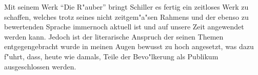 Mit seinem Werk "`Die R"auber"' bringt Schiller es fertig ein zeitloses Werk zu schaffen, welches trotz seines nicht zeitgem"a"sen Rahmens und der ebenso zu bewertenden Sprache immernoch aktuell ist und auf unsere Zeit angewendet werden kann. Jedoch ist der literarische Anspruch der seinen Themen entgegengebracht wurde in meinen Augen bewusst zu hoch angesetzt, was dazu f"uhrt, dass,  heute wie damals, Teile der Bevo"lkerung als Publikum ausgeschlossen werden.